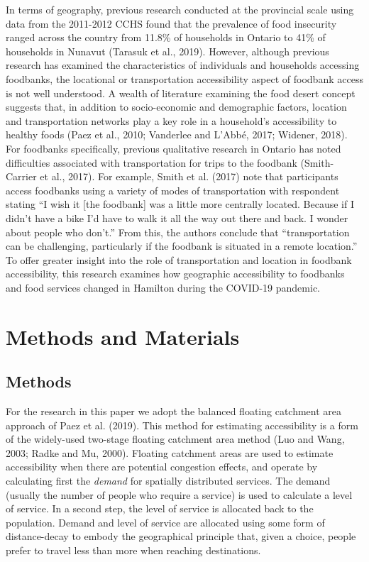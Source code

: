 \documentclass[]{elsarticle} %
\begin{document}
In terms of geography, previous research conducted at the provincial
scale using data from the 2011-2012 CCHS found that the prevalence of
food insecurity ranged across the country from 11.8\% of households in
Ontario to 41\% of households in Nunavut (Tarasuk et al., 2019).
However, although previous research has examined the characteristics of
individuals and households accessing foodbanks, the locational or
transportation accessibility aspect of foodbank access is not well
understood. A wealth of literature examining the food desert concept
suggests that, in addition to socio-economic and demographic factors,
location and transportation networks play a key role in a household's
accessibility to healthy foods (Paez et al., 2010; Vanderlee and L'Abbé,
2017; Widener, 2018). For foodbanks specifically, previous qualitative
research in Ontario has noted difficulties associated with
transportation for trips to the foodbank (Smith-Carrier et al., 2017).
For example, Smith et al. (2017) note that participants access foodbanks
using a variety of modes of transportation with respondent stating ``I
wish it {[}the foodbank{]} was a little more centrally located. Because
if I didn't have a bike I'd have to walk it all the way out there and
back. I wonder about people who don't.'' From this, the authors conclude
that ``transportation can be challenging, particularly if the foodbank
is situated in a remote location.'' To offer greater insight into the
role of transportation and location in foodbank accessibility, this
research examines how geographic accessibility to foodbanks and food
services changed in Hamilton during the COVID-19 pandemic.

\hypertarget{methods-and-materials}{%
\section{Methods and Materials}\label{methods-and-materials}}

\hypertarget{methods}{%
\subsection{Methods}\label{methods}}

For the research in this paper we adopt the balanced floating catchment
area approach of Paez et al. (2019). This method for estimating
accessibility is a form of the widely-used two-stage floating catchment
area method (Luo and Wang, 2003; Radke and Mu, 2000). Floating catchment
areas are used to estimate accessibility when there are potential
congestion effects, and operate by calculating first the \emph{demand}
for spatially distributed services. The demand (usually the number of
people who require a service) is used to calculate a level of service.
In a second step, the level of service is allocated back to the
population. Demand and level of service are allocated using some form of
distance-decay to embody the geographical principle that, given a
choice, people prefer to travel less than more when reaching
destinations.
\end{document}
